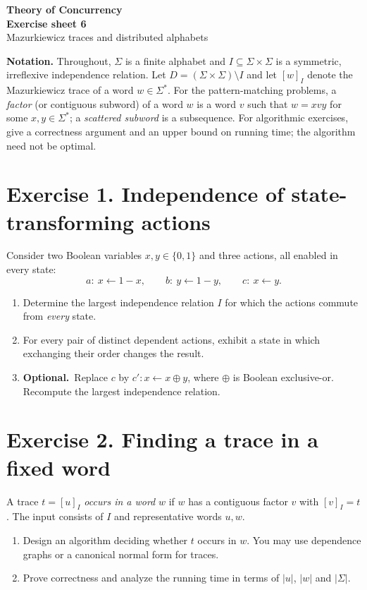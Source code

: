 \documentclass[10pt,a4paper]{article}
\newcommand{\extra}{\textbf{Optional.}\ }
\begin{document}
\begin{center}
  {\large \textbf{Theory of Concurrency}}\\[0.25em]
  {\LARGE \textbf{Exercise sheet 6}}\\[0.2em]
  {\large Mazurkiewicz traces and distributed alphabets}
\end{center}
\vspace{0.25em}

\textbf{Notation.}
Throughout, $\Sigma$ is a finite alphabet and $I\subseteq\Sigma\times\Sigma$
is a symmetric, irreflexive independence relation. Let
$D=(\Sigma\times\Sigma)\setminus I$ and let $[w]_I$ denote the
Mazurkiewicz trace of a word $w\in\Sigma^*$.
For the pattern-matching problems, a \emph{factor} (or contiguous subword)
of a word $w$ is a word $v$ such that $w=xvy$ for some $x,y\in\Sigma^*$;
a \emph{scattered subword} is a subsequence.
For algorithmic exercises, give a correctness argument and an upper bound
on running time; the algorithm need not be optimal.

\section*{Exercise 1. Independence of state-transforming actions}
Consider two Boolean variables $x,y\in\{0,1\}$ and three actions,
all enabled in every state:
\[
 a:\ x\leftarrow 1-x,\qquad
 b:\ y\leftarrow 1-y,\qquad
 c:\ x\leftarrow y.
\]
\begin{enumerate}
\item Determine the largest independence relation $I$ for which the
      actions commute from \emph{every} state.
\item For every pair of distinct dependent actions, exhibit a state in
      which exchanging their order changes the result.

\item \extra Replace $c$ by $c':x\leftarrow x\oplus y$, where
      $\oplus$ is Boolean exclusive-or. Recompute the largest
      independence relation.
\end{enumerate}

\section*{Exercise 2. Finding a trace in a fixed word}
\label{ex:word}
A trace $t=[u]_I$ \emph{occurs in a word} $w$ if $w$ has a
contiguous factor $v$ with $[v]_I=t$. The input consists of $I$ and
representative words $u,w$.
\begin{enumerate}
\item Design an algorithm deciding whether $t$ occurs in $w$.
      You may use dependence graphs or a canonical normal form for traces.
\item Prove correctness and analyze the running time in terms of
      $|u|$, $|w|$ and $|\Sigma|$.
\end{enumerate}
\end{document}
